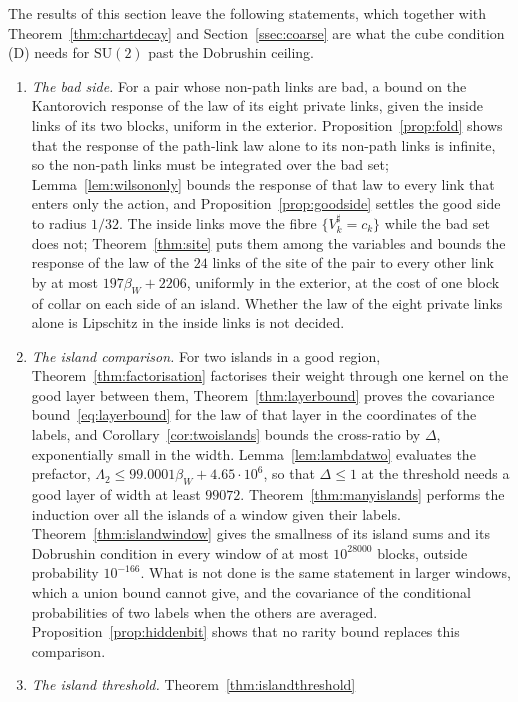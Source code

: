 \documentclass[11pt]{amsart}
\theoremstyle{definition}
\theoremstyle{remark}
\numberwithin{equation}{section}
\newcommand{\SU}{\mathrm{SU}}
\begin{document}
The results of this section leave the following statements, which together
with Theorem~\ref{thm:chartdecay} and Section~\ref{ssec:coarse} are what the
cube condition (D) needs for $\SU(2)$ past the Dobrushin ceiling.
\begin{enumerate}[label=\textup{(\roman*)},leftmargin=*]
\item \emph{The bad side.} For a pair whose non-path links are bad, a bound
on the Kantorovich response of the law of its eight private links, given
the inside links of its two blocks, uniform in the exterior.
Proposition~\ref{prop:fold} shows that the response of the path-link law
alone to its non-path links is infinite, so the non-path links must be
integrated over the bad set; Lemma~\ref{lem:wilsononly} bounds the response
of that law to every link that enters only the action, and
Proposition~\ref{prop:goodside} settles the good side to radius $1/32$.
The inside links move the fibre $\{V^\sharp_k=c_k\}$ while the bad set
does not; Theorem~\ref{thm:site} puts them among the variables and bounds
the response of the law of the $24$ links of the site of the pair to every
other link by at most $197\beta_W+2206$, uniformly in the exterior, at the
cost of one block of collar on each side of an island. Whether the law of
the eight private links alone is Lipschitz in the inside links is not
decided.
\item \emph{The island comparison.} For two islands in a good region,
Theorem~\ref{thm:factorisation} factorises their weight through one
kernel on the good layer between them, Theorem~\ref{thm:layerbound}
proves the covariance bound~\eqref{eq:layerbound} for the law of that
layer in the coordinates of the labels, and Corollary~\ref{cor:twoislands}
bounds the cross-ratio by $\varDelta$, exponentially small in the width.
Lemma~\ref{lem:lambdatwo} evaluates the prefactor, $\Lambda_2\le99.0001
\beta_W+4.65\cdot10^6$, so that $\varDelta\le1$ at the threshold needs a good
layer of width at least $99072$. Theorem~\ref{thm:manyislands} performs the induction over all the
islands of a window given their labels. Theorem~\ref{thm:islandwindow} gives the smallness of its island sums
and its Dobrushin condition in every window of at most $10^{28000}$
blocks, outside probability $10^{-166}$. What is not done is the same
statement in larger windows, which a union bound cannot give, and the
covariance of the conditional probabilities of two labels when the others
are averaged.
Proposition~\ref{prop:hiddenbit} shows that no rarity bound replaces this
comparison.
\item \emph{The island threshold.} Theorem~\ref{thm:islandthreshold}

\end{enumerate}
\end{document}
